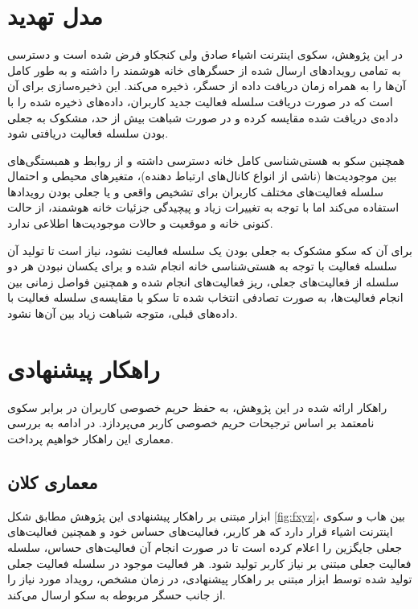 \section{مدل تهدید}\label{chapter:c42}

در این پژوهش، سکوی اینترنت اشیاء صادق ولی کنجکاو فرض شده است و دسترسی به تمامی رویدادهای ارسال شده از حسگرهای خانه هوشمند را داشته و به طور کامل آن‌ها را به همراه زمان دریافت داده از حسگر، ذخیره می‌کند. این ذخیره‌سازی برای آن است که در صورت دریافت سلسله فعالیت جدید کاربران، داده‌های ذخیره شده را با داده‌ی دریافت شده مقایسه کرده و در صورت شباهت بیش از حد، مشکوک به جعلی بودن سلسله فعالیت دریافتی شود.

همچنین سکو به هستی‌شناسی کامل خانه دسترسی داشته و از روابط و همبستگی‌های بین موجودیت‌ها (ناشی از انواع کانال‌های ارتباط دهنده)، متغیرهای محیطی و احتمال سلسله فعالیت‌های مختلف کاربران برای تشخیص واقعی و یا جعلی بودن رویدادها استفاده می‌کند اما با توجه به تغییرات زیاد و پیچیدگی جزئیات خانه هوشمند، از حالت کنونی خانه و موقعیت و حالات موجودیت‌ها اطلاعی ندارد.

برای آن که سکو مشکوک به جعلی بودن یک سلسله فعالیت نشود، نیاز است تا تولید آن سلسله فعالیت با توجه به هستی‌شناسی خانه انجام شده و برای یکسان نبودن هر دو سلسله از فعالیت‌های جعلی، ریز فعالیت‌های انجام شده و همچنین فواصل زمانی بین انجام فعالیت‌ها، به صورت تصادفی انتخاب شده تا سکو با مقایسه‌ی سلسله فعالیت با داده‌های قبلی، متوجه شباهت زیاد بین آن‌ها نشود.

\section{راهکار پیشنهادی}

راهکار ارائه شده در این پژوهش، به حفظ حریم خصوصی کاربران در برابر سکوی نامعتمد بر اساس ترجیحات حریم خصوصی کاربر می‌پردازد. در ادامه به بررسی معماری این راهکار خواهیم پرداخت.

\subsection{معماری کلان}

ابزار مبتنی بر راهکار پیشنهادی این پژوهش مطابق شکل \ref{fig:fxyz}، بین هاب و سکوی اینترنت اشیاء قرار دارد که هر کاربر، فعالیت‌های حساس خود و همچنین فعالیت‌های‌ جعلی جایگزین را اعلام کرده است تا در صورت انجام آن فعالیت‌های حساس، سلسله فعالیت جعلی مبتنی بر نیاز کاربر تولید شود. هر‌ فعالیت موجود در سلسله فعالیت جعلی تولید شده توسط ابزار مبتنی بر راهکار پیشنهادی، در زمان مشخص، رویداد مورد نیاز را از جانب حسگر مربوطه به سکو ارسال می‌کند.

